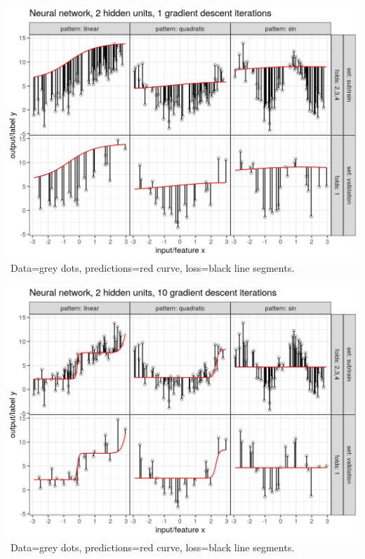 
\begin{frame}
  \includegraphics[width=\textwidth]{figure-overfitting-pred-units=2-maxit=1.png}
\ Data=grey dots, predictions=red curve, loss=black line segments.

\end{frame}


\begin{frame}
  \includegraphics[width=\textwidth]{figure-overfitting-pred-units=2-maxit=10.png}
\ Data=grey dots, predictions=red curve, loss=black line segments.

\end{frame}


